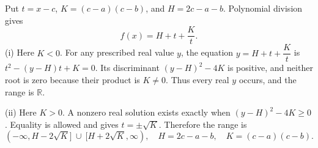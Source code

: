 Put $t=x-c$, $K=(c-a)(c-b)$, and $H=2c-a-b$. Polynomial division gives
\[
f(x)=H+t+\dfrac{K}{t}.
\]
(i) Here $K<0$. For any prescribed real value $y$, the equation $y=H+t+\dfrac{K}{t}$ is
$t^2-(y-H)t+K=0$. Its discriminant $(y-H)^2-4K$ is positive, and neither root is zero because their product is $K\ne0$. Thus every real $y$ occurs, and the range is $\boxed{\mathbb R}$.

(ii) Here $K>0$. A nonzero real solution exists exactly when $(y-H)^2-4K\ge0$. Equality is allowed and gives $t=\pm\sqrt K$. Therefore the range is
\[
\boxed{(-\infty,H-2\sqrt K]\ \cup\ [H+2\sqrt K,\infty)},
\quad H=2c-a-b,\quad K=(c-a)(c-b).
\]
